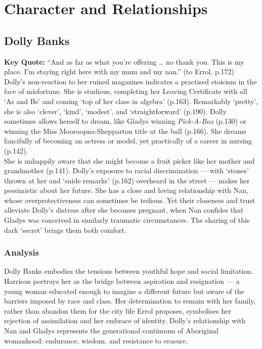\documentclass[a4paper]{article}
\begin{document}
\newpage

\newpage

\section{Character and Relationships}

\subsection{Dolly Banks}
\textbf{Key Quote:} ``And as far as what you’re offering … no thank you. This is my place. I’m staying right here with my mum and my nan.'' (to Errol, p.172)\\

Dolly’s non-reaction to her ruined magazines indicates a practised stoicism in the face of misfortune. She is studious, completing her Leaving Certificate with all ‘As and Bs’ and coming ‘top of her class in algebra’ (p.163). Remarkably ‘pretty’, she is also ‘clever’, ‘kind’, ‘modest’, and ‘straightforward’ (p.190). Dolly sometimes allows herself to dream, like Gladys winning \textit{Pick-A-Box} (p.130) or winning the Miss Mooroopna-Shepparton title at the ball (p.166). She dreams fancifully of becoming an actress or model, yet practically of a career in nursing (p.142).\\

She is unhappily aware that she might become a fruit picker like her mother and grandmother (p.141). Dolly’s exposure to racial discrimination — with ‘stones’ thrown at her and ‘snide remarks’ (p.162) overheard in the street — makes her pessimistic about her future. She has a close and loving relationship with Nan, whose overprotectiveness can sometimes be tedious. Yet their closeness and trust alleviate Dolly’s distress after she becomes pregnant, when Nan confides that Gladys was conceived in similarly traumatic circumstances. The sharing of this dark ‘secret’ brings them both comfort.\\

\subsubsection{Analysis}
Dolly Banks embodies the tensions between youthful hope and social limitation. Harrison portrays her as the bridge between aspiration and resignation — a young woman educated enough to imagine a different future but aware of the barriers imposed by race and class. Her determination to remain with her family, rather than abandon them for the city life Errol proposes, symbolises her rejection of assimilation and her embrace of identity. Dolly’s relationship with Nan and Gladys represents the generational continuum of Aboriginal womanhood: endurance, wisdom, and resistance to erasure.\\
\end{document}
